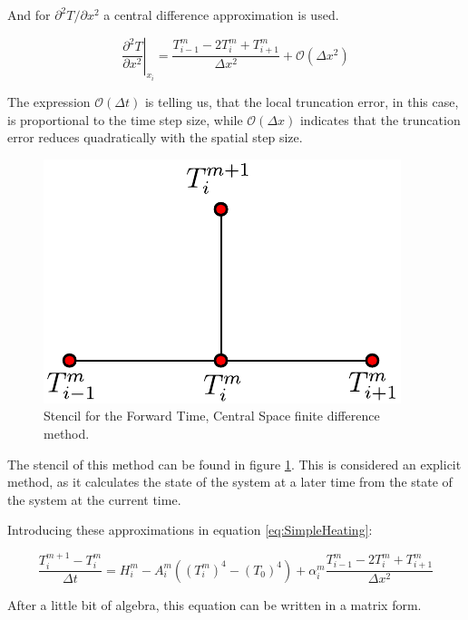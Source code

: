 And for $\partial^2 T/ \partial x^2$ a central difference approximation is used. 

\begin{equation}
    \left. \frac{\partial^2 T}{\partial x^2}\right|_{x_i} = \frac{T^{m}_{i-1}-2T^m_{i}+T^m_{i+1}}{\Delta x^2}+\mathcal{O}\left(\Delta x^2 \right)
    \label{eq:CD}
\end{equation}

The expression $\mathcal{O}(\Delta t)$ is telling us, that the local truncation error, in this case, is proportional to the time step size, while $\mathcal{O}(\Delta x)$ indicates that the truncation error reduces quadratically with the spatial step size. 

\begin{figure}[h]
    \centering
    \includegraphics[width=0.35\columnwidth]{Stencils_FiniteDifferences/FTCS.pdf}
    \caption{Stencil for the Forward Time, Central Space finite difference method.}
    \label{fig:StencilFTCS}
\end{figure}

The stencil of this method can be found in figure \ref{fig:StencilFTCS}. This is considered an explicit method, as it calculates the state of the system at a later time from the state of the system at the current time. 

Introducing these approximations in equation \ref{eq:SimpleHeating}:

\begin{equation}
    \frac{T^{m+1}_i - T^m_i}{\Delta t} = H^m_i - A_i^m \left((T_i^m )^4 - (T_0)^4\right) +\alpha_i^m    \frac{T^{m}_{i-1}-2T^m_{i}+T^m_{i+1}}{\Delta x^2}
\end{equation}

After a little bit of algebra, this equation can be written in a matrix form.

